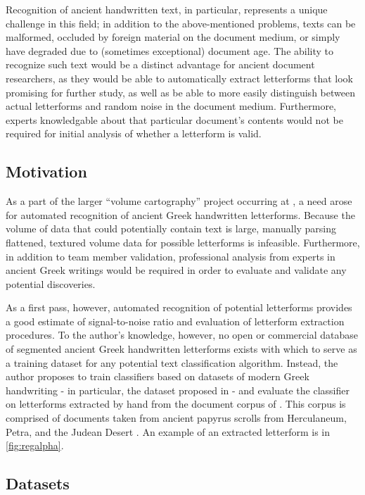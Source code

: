\documentclass[10pt,twocolumn,letterpaper]{article}
\begin{document}
Recognition of ancient handwritten text, in particular, represents a unique challenge in this field; in addition to the above-mentioned problems, texts can be malformed, occluded by foreign material on the document medium, or simply have degraded due to (sometimes exceptional) document age. The ability to recognize such text would be a distinct advantage for ancient document researchers, as they would be able to automatically extract letterforms that look promising for further study, as well as be able to more easily distinguish between actual letterforms and random noise in the document medium. Furthermore, experts knowledgable about that particular document's contents would not be required for initial analysis of whether a letterform is valid.

\subsection{Motivation}

As a part of the larger “volume cartography” project occurring at \cite{VisCenter}, a need arose for automated recognition of ancient Greek handwritten letterforms.  Because the volume of data that could potentially contain text is large, manually parsing flattened, textured volume data for possible letterforms is infeasible. Furthermore, in addition to team member validation, professional analysis from experts in ancient Greek writings would be required in order to evaluate and validate any potential discoveries.

As a first pass, however, automated recognition of potential letterforms provides a good estimate of signal-to-noise ratio and evaluation of letterform extraction procedures. To the author’s knowledge, however, no open or commercial database of segmented ancient Greek handwritten letterforms exists with which to serve as a training dataset for any potential text classification algorithm. Instead, the author proposes to train classifiers based on datasets of modern Greek handwriting - in particular, the dataset proposed in \cite{GCDB} - and evaluate the classifier on letterforms extracted by hand from the document corpus of \cite{BYU}. This corpus is comprised of documents taken from ancient papyrus scrolls from Herculaneum, Petra, and the Judean Desert \cite{chabries2003imaging}. An example of an extracted letterform is in \ref{fig:regalpha}.

\subsection{Datasets}
\end{document}
